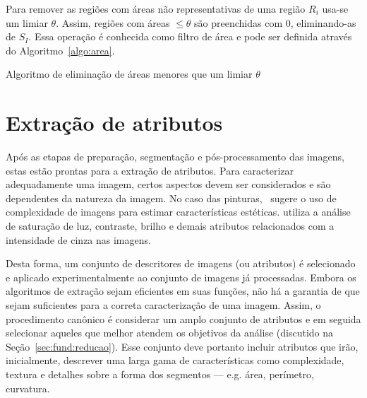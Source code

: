 Para remover as regiões com áreas não representativas de uma região
$R_i$ usa-se um limiar $\theta$. Assim, regiões com áreas $\leq
\theta$ são preenchidas com $0$, eliminando-as de $S_I$. Essa operação
é conhecida como filtro de área e pode ser definida através do
Algoritmo~\ref{algo:area}.

\begin{espacosimples}
\begin{algorithm2e}[H]
  \caption{Algoritmo de eliminação de áreas menores que um limiar $\theta$}
  \label{algo:area}
  \SetAlgoLined

\end{algorithm2e}
\end{espacosimples}
             
\section{Extração de atributos}
\label{sec:atributos}

Após as etapas de preparação, segmentação e pós-processamento das
imagens, estas estão prontas para a extração de atributos. Para
caracterizar adequadamente uma imagem, certos aspectos devem ser
considerados e são dependentes da natureza da imagem. No caso das
pinturas,~\citeauthor{penousal} sugere o uso de complexidade de
imagens para estimar características
estéticas. \citeauthor{manovich,manovich2,manovich3} utiliza a análise
de saturação de luz, contraste, brilho e demais atributos relacionados
com a intensidade de cinza nas imagens.


Desta forma, um conjunto de descritores de imagens (ou atributos) é
selecionado e aplicado experimentalmente ao conjunto de imagens já
processadas. Embora os algoritmos de extração sejam eficientes em suas
funções, não há a garantia de que sejam suficientes para a correta
caracterização de uma imagem. Assim, o procedimento canônico é
considerar um amplo conjunto de atributos e em seguida selecionar
aqueles que melhor atendem os objetivos da análise (discutido na
Seção~\ref{sec:fund:reducao}). Esse conjunto deve portanto incluir
atributos que irão, inicialmente, descrever uma larga gama de
características como complexidade, textura e detalhes sobre a forma
dos segmentos --- e.g. área, perímetro, curvatura.

